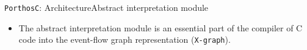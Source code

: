 \documentclass[aspectratio=149]{beamer}
\newcommand{\tool}[1]{\texttt{#1}}
\begin{document}
\begin{frame}{\tool{PorthosC}: Architecture}{Abstract interpretation module}
  \vspace{-40pt}
\begin{minipage}{.4\textwidth}
\begin{itemize}
\item The abstract interpretation module is an essential part of the compiler of C code into the event-flow graph representation (\texttt{X-graph}).
\end{itemize}
\hfill
\end{minipage}
%
\begin{minipage}{.5\textwidth}
\end{minipage}
\end{frame}
\end{document}
